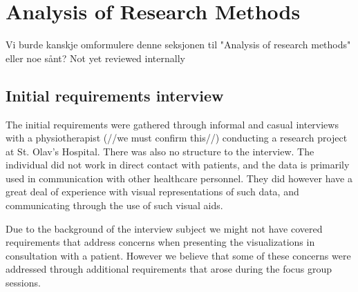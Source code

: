 \chapter{Analysis of Research Methods}
Vi burde kanskje omformulere denne seksjonen til "Analysis of research methods" eller noe sånt?
{\Large Not yet reviewed internally}

\section{Initial requirements interview}
The initial requirements were gathered through informal and casual interviews with a physiotherapist (//we must confirm this//) conducting a research project at St. Olav's Hospital. There was also no structure to the interview. The individual did not work in direct contact with patients, and the data is primarily used in communication with other healthcare personnel. 
They did however have a great deal of experience with visual representations of such data, and communicating through the use of such visual aids.

Due to the background of the interview subject we might not have covered requirements that address concerns when presenting the visualizations in consultation with a patient. 
However we believe that some of these concerns were addressed through additional requirements that arose during the focus group sessions.

